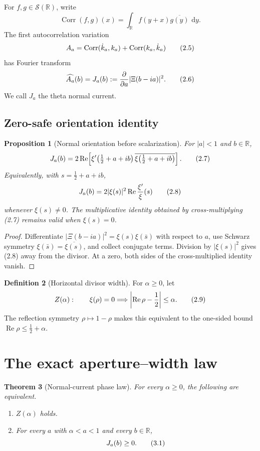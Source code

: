 \documentclass[11pt]{article}
\newtheorem{theorem}{Theorem}[section]
\newtheorem{proposition}[theorem]{Proposition}
\theoremstyle{definition}
\newtheorem{definition}[theorem]{Definition}
\theoremstyle{remark}
\newcommand{\R}{\mathbb R}
\newcommand{\dd}{\,\mathrm d}
\newcommand{\Rea}{\operatorname{Re}}
\newcommand{\eqtag}[1]{\qquad\text{\upshape(#1)}}
\begin{document}
For \(f,g\in\mathcal S(\R)\), write
\[
  \operatorname{Corr}(f,g)(x)
  =\int_{\R} f(y+x)\overline{g(y)}\,\dd y.
\]
The first autocorrelation variation
\[
  A_a=\operatorname{Corr}(\dot k_a,k_a)
       +\operatorname{Corr}(k_a,\dot k_a)            \eqtag{2.5}
\]
has Fourier transform
\[
  \widehat{A_a}(b)=J_a(b)
  :=\frac{\partial}{\partial a}|\Xi(b-ia)|^2.        \eqtag{2.6}
\]
We call \(J_a\) the theta normal current.

\subsection{Zero-safe orientation identity}

\begin{proposition}[Normal orientation before scalarization]
\label{prop:current}
For \(|a|<1\) and \(b\in\R\),
\[
  J_a(b)
   =2\Rea\!\left[
       \xi'\!\left(\tfrac12+a+ib\right)
       \overline{\xi\!\left(\tfrac12+a+ib\right)}
     \right].                                       \eqtag{2.7}
\]
Equivalently, with \(s=\frac12+a+ib\),
\[
  J_a(b)
   =2|\xi(s)|^2\Rea\frac{\xi'}{\xi}(s)               \eqtag{2.8}
\]
whenever \(\xi(s)\neq0\).  The multiplicative identity obtained by
cross-multiplying (2.7) remains valid when \(\xi(s)=0\).
\end{proposition}

\begin{proof}
Differentiate
\(
|\Xi(b-ia)|^2
=\xi(s)\xi(\bar s)
\)
with respect to \(a\), use Schwarz symmetry
\(\xi(\bar s)=\overline{\xi(s)}\), and collect conjugate terms.
Division by \(|\xi(s)|^2\) gives (2.8) away from the divisor.  At a
zero, both sides of the cross-multiplied identity vanish.
\end{proof}

\begin{definition}[Horizontal divisor width]
\label{def:width}
For \(\alpha\geq0\), let
\[
  Z(\alpha):
  \qquad
  \xi(\rho)=0\Longrightarrow
  \left|\Rea\rho-\frac12\right|\leq\alpha.            \eqtag{2.9}
\]
The reflection symmetry \(\rho\mapsto1-\rho\) makes this equivalent to
the one-sided bound \(\Rea\rho\leq\frac12+\alpha\).
\end{definition}

\section{The exact aperture--width law}

\begin{theorem}[Normal-current phase law]
\label{thm:width}
For every \(\alpha\geq0\), the following are equivalent.
\begin{enumerate}[label=\textup{(\roman*)}]
\item \(Z(\alpha)\) holds.
\item For every \(a\) with \(\alpha<a<1\) and every \(b\in\R\),
      \[
        J_a(b)\geq0.                                 \eqtag{3.1}
      \]
\end{enumerate}
\end{theorem}
\end{document}
